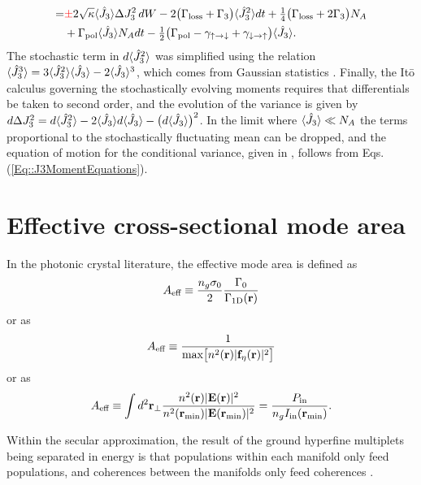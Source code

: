 \documentclass[preprint,aps,pra,onecolumn]{revtex4-1} %
\newcommand{\oneD}{{\rm 1D}}
\newcommand{\inp}{{\rm in}}
\newcommand{\varz}{\Delta J_3^2}
\newcommand{\jz}{\hat{J}_3}
\newcommand{\gammaud}{\gamma_{\uparrow \rightarrow \downarrow}}
\newcommand{\gammadu}{\gamma_{\downarrow \rightarrow \uparrow}}
\newcommand{\lrate}{\Gamma_{\rm loss}}
\newcommand{\prate}{\Gamma_{\rm pol}}
\newcommand{\zrate}{\Gamma_{3}}
\newcommand{\change}[1]{{\color{RoyalBlue} #1}}
\newcommand{\error}[1]{{\color{red} #1}}
\begin{document}
\begin{appendix}
\begin{subequations}
\begin{align}
		=& \error{\pm} 2\sqrt{\kappa} \expt{\jz}\Delta J_3^2 \, dW - 2 \big( \lrate + \zrate \big) \expt{\jz^2}dt + \smallfrac{1}{4} \big( \lrate + 2\zrate \big) N_A  \\
		&+ \prate \expt{\jz} N_A dt - \smallfrac{1}{2} \big( \prate - \gammaud + \gammadu \big)\expt{\jz}. \nonumber 
	\end{align}
	\end{subequations}
The stochastic term in $d\expt{\jz^2}$ was simplified using the relation $\expt{\jz^3} = 3\expt{\jz^2}\expt{\jz}- 2\expt{\jz}^3$, which comes from Gaussian statistics \cite{jacobs_straightforward_2006}. 
Finally, the It\={o} calculus governing the stochastically evolving moments requires that differentials be taken to second order, and the evolution of the variance is given by $d \varz = d \expt{\jz^2} - 2 \expt{\jz} d \expt{\jz} - \big( d \expt{\jz} \big)^2$. In the limit where $\expt{\jz}\ll N_A$ the terms proportional to the stochastically fluctuating mean can be dropped, and the equation of motion for the conditional variance, given in , follows from Eqs. (\ref{Eq::J3MomentEquations}).


\change{
\section{Effective cross-sectional mode area} \label{Appendix::ModeArea}
In the photonic crystal literature, the effective mode area is defined as \cite{goban_atomlight_2014}
	\begin{align}
		A_\eff \equiv \frac{n_g \sigma_0}{2} \frac{\Gamma_0}{\Gamma_\oneD(\mathbf{r})}
	\end{align}
or as \cite{manga_rao_single_2007}
	\begin{align}
		A_{\text{eff}} \equiv \frac{1}{ \mbox{max} \big[ n^2(\mathbf{r}) |\mathbf{f}_\eta(\mathbf{r})|^2 \big]}
	\end{align}
or as \cite{hung_trapped_2013}
	\begin{align}
		A_\eff \equiv \int d^2 \mathbf{r}_\perp \frac{n^2(\mathbf{r}) |\mathbf{E}(\mathbf{r})|^2 }{n^2(\mathbf{r}_{\rm min}) |\mathbf{E}(\mathbf{r}_{\rm min})|^2 } =  \frac{P_\inp}{ n_g  I_\inp(\mathbf{r}_{\rm min}) }.
	\end{align}
	
Within the secular approximation, the result of the ground hyperfine multiplets being separated in energy is that populations within each manifold only feed populations, and coherences between the manifolds only feed coherences \cite{deutsch_quantum_2010}.  
}

\end{appendix}
\end{document}
